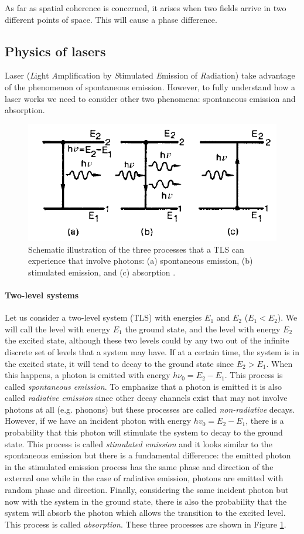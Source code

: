 \documentclass[11pt,a4paper]{article}
\begin{document}
As far as spatial coherence is concerned, it arises when two fields arrive in two different points of space. This will cause a phase difference.

\subsection{Physics of lasers}

Laser (\emph{L}ight \emph{A}mplification by \emph{S}timulated \emph{E}mission of \emph{R}adiation) take advantage of the phenomenon of spontaneous emission. However, to fully understand how a laser works we need to consider other two phenomena: spontaneous emission and absorption.

\begin{figure}[ht]
\centering
\includegraphics[width=.6\textwidth]{TLS}
\caption{Schematic illustration of the three processes that a TLS can experience that involve photons: (a) spontaneous emission, (b) stimulated emission, and (c) absorption \cite{svelto2010principles}.}
\label{fig:2LS}
\end{figure}

\paragraph{Two-level systems}
Let us consider a two-level system (TLS) with energies $E_1$ and $E_2$ ($E_1<E_2$). We will call the level with energy $E_1$ the ground state, and the level with energy $E_2$ the excited state, although these two levels could by any two out of the infinite discrete set of levels that a system may have. If at a certain time, the system is in the excited state, it will tend to decay to the ground state since $E_2>E_1$. When this happens, a photon is emitted with energy $h\nu_0=E_2-E_1$. This process is called \emph{spontaneous emission}. To emphasize that a photon is emitted it is also called \emph{radiative emission} since other decay channels exist that may not involve photons at all (e.g. phonons) but these processes are called \emph{non-radiative} decays. However, if we have an incident photon with energy $hv_0=E_2-E_1$, there is a probability that this photon will stimulate the system to decay to the ground state. This process is called \emph{stimulated emission} and it looks similar to the spontaneous emission but there is a fundamental difference: the emitted photon in the stimulated emission process has the same phase and direction of the external one while in the case of radiative emission, photons are emitted with random phase and direction. Finally, considering the same incident photon but now with the system in the ground state, there is also the probability that the system will absorb the photon which allows the transition to the excited level. This process is called \emph{absorption}. These three processes are shown in Figure \ref{fig:2LS}.
\end{document}
